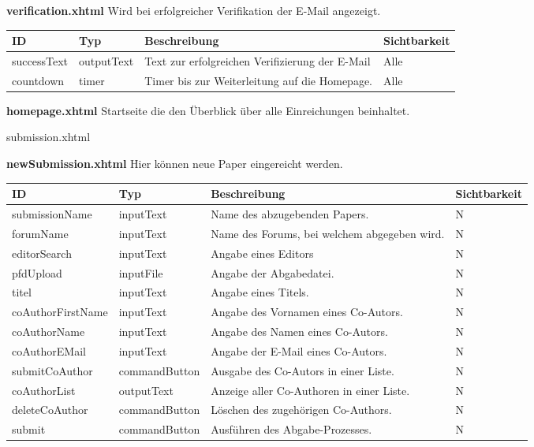 \textbf{verification.xhtml} Wird bei erfolgreicher Verifikation der E-Mail angezeigt.

\begin{tabular}[H]{|m{2cm}|m{3cm}|m{6cm}|m{2.5cm}|}
    \hline
    \textbf{ID} & \textbf{Typ} & \textbf{Beschreibung} & \textbf{Sichtbarkeit} \\
    \hline
    \hline
    successText & outputText & Text zur erfolgreichen Verifizierung der E-Mail & Alle\\
    \hline
    countdown & timer & Timer bis zur Weiterleitung auf die Homepage. & Alle \\
    \hline
\end{tabular}

\textbf{homepage.xhtml} Startseite die den Überblick über alle Einreichungen beinhaltet.

submission.xhtml

\textbf{newSubmission.xhtml} Hier können neue Paper eingereicht werden.

\begin{tabular}[H]{|m{2cm}|m{3cm}|m{6cm}|m{2.5cm}|}
    \hline
    \textbf{ID} & \textbf{Typ} & \textbf{Beschreibung} & \textbf{Sichtbarkeit} \\
    \hline
    \hline
    submissionName & inputText & Name des abzugebenden Papers. & N\\
    \hline
    forumName & inputText & Name des Forums, bei welchem abgegeben wird. & N \\
    \hline
    editorSearch & inputText & Angabe eines Editors & N\\
    \hline
    pfdUpload & inputFile & Angabe der Abgabedatei. & N\\
    \hline
    titel & inputText & Angabe eines Titels. & N\\
    \hline
    coAuthorFirstName & inputText & Angabe des Vornamen eines Co-Autors.& N\\
    \hline
    coAuthorName & inputText & Angabe des Namen eines Co-Autors. & N\\
    \hline
    coAuthorEMail & inputText & Angabe der E-Mail eines Co-Autors. & N\\
    \hline
    submitCoAuthor & commandButton & Ausgabe des Co-Autors in einer Liste. & N\\
    \hline
    coAuthorList & outputText & Anzeige aller Co-Authoren in einer Liste. & N\\
    \hline
    deleteCoAuthor & commandButton & Löschen des zugehörigen Co-Authors. & N\\
    \hline
    submit & commandButton & Ausführen des Abgabe-Prozesses. & N \\
    \hline
\end{tabular}

